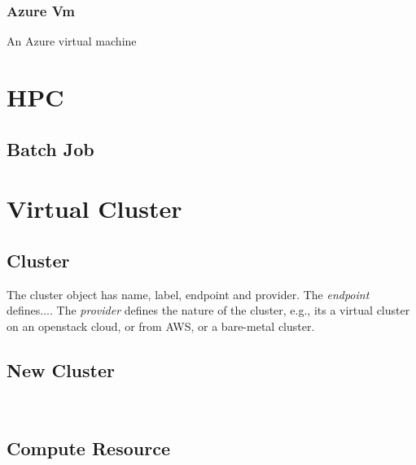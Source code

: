 \documentclass[9pt,twocolumn]{styles/osajnl}
\begin{document}

\subsubsection{Azure Vm}

An Azure virtual machine



\section{HPC}

\subsection{Batch Job}


\section{Virtual Cluster}

\subsection{Cluster}

The cluster object has name, label, endpoint and provider. The
\textit{endpoint} defines....  The \textit{provider} defines the
nature of the cluster, e.g., its a virtual cluster on an openstack
cloud, or from AWS, or a bare-metal cluster.



\subsection{New Cluster}

\
\subsection{Compute Resource}
\end{document}
